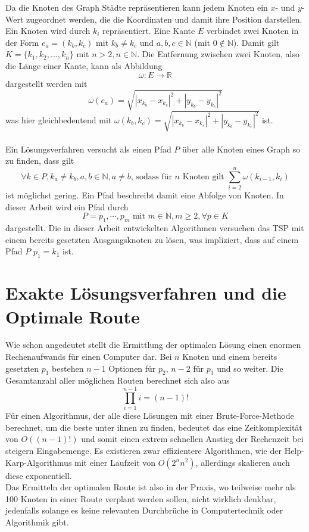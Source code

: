 Da die Knoten des Graph Städte repräsentieren kann jedem Knoten ein $x$- und $y$- Wert zugeordnet werden, die die Koordinaten und damit ihre Position darstellen.
Ein Knoten wird durch $k_i$ repräsentiert.
Eine Kante $E$ verbindet zwei Knoten in der Form $e_a = (k_b,k_c)$ mit $k_b \neq k_c$ und $a,b,c \in \mathbb{N}$ (mit $0 \not \in \mathbb{N}$).
Damit gilt $K=\{k_1,k_2,...,k_n\}$ mit $n > 2, n \in \mathbb{N}$.
Die Entfernung zwischen zwei Knoten, also die Länge einer Kante, kann als Abbildung $$\omega : E \rightarrow \mathbb{R}$$ 
dargestellt werden mit 
$$\omega(e_a) = \sqrt{|x_{k_b} - x_{k_c}|^2 + |y_{k_b} - y_{k_c}|^2}$$
was hier gleichbedeutend mit $\omega(k_b,k_c) = \sqrt{|x_{k_b} - x_{k_c}|^2 + |y_{k_b} - y_{k_c}|^2}$ ist.
\\\\
Ein Lösungsverfahren versucht als einen Pfad $P$ über alle Knoten eines Graph so zu finden, dass gilt
$$\forall k \in P,k_a \neq k_b, a,b\in \mathbb{N},a\neq b \textrm{, sodass für $n$ Knoten gilt } \sum_{i=2}^n \omega(k_{i-1},k_i)$$
ist möglichst gering.
Ein Pfad beschreibt damit eine Abfolge von Knoten. In dieser Arbeit wird ein Pfad durch
$$P=p_1,\cdots,p_m \textrm{ mit } m\in\mathbb{N},m \geq 2, \forall p \in K$$
dargestellt.
Die in dieser Arbeit entwickelten Algorithmen versuchen das \ac{TSP} mit einem bereits gesetzten Ausgangsknoten zu lösen, was impliziert, dass auf einem Pfad $P$ $p_1 = k_1$ ist.
\section{Exakte Lösungsverfahren und die Optimale Route}
Wie schon angedeutet stellt die Ermittlung der optimalen Lösung einen enormen Rechenaufwands für einen Computer dar.
Bei $n$ Knoten und einem bereits gesetzten $p_1$ bestehen $n-1$ Optionen für $p_2$, $n-2$ für $p_3$ und so weiter.
Die Gesamtanzahl aller möglichen Routen berechnet sich also aus
$$\prod_{i=1}^{n-1} i = (n-1)!$$
Für einen Algorithmus, der alle diese Lösungen mit einer Brute-Force-Methode berechnet, um die beste unter ihnen zu finden, bedeutet das eine Zeitkomplexität von $O((n-1)!)$ und somit einen extrem schnellen Anstieg der Rechenzeit bei steigern Eingabemenge.\autocite[18]{Gurski.2010}
Es existieren zwar effizientere Algorithmen, wie der Help-Karp-Algorithmus\autocite[14]{Hutchinson.2016} mit einer Laufzeit von $O(2^nn^2)$, allerdings skalieren auch diese exponentiell.
\\
Das Ermitteln der optimalen Route ist also in der Praxis, wo teilweise mehr als 100 Knoten in einer Route verplant werden sollen, nicht wirklich denkbar, jedenfalls solange es keine relevanten Durchbrüche in Computertechnik oder Algorithmik gibt.

